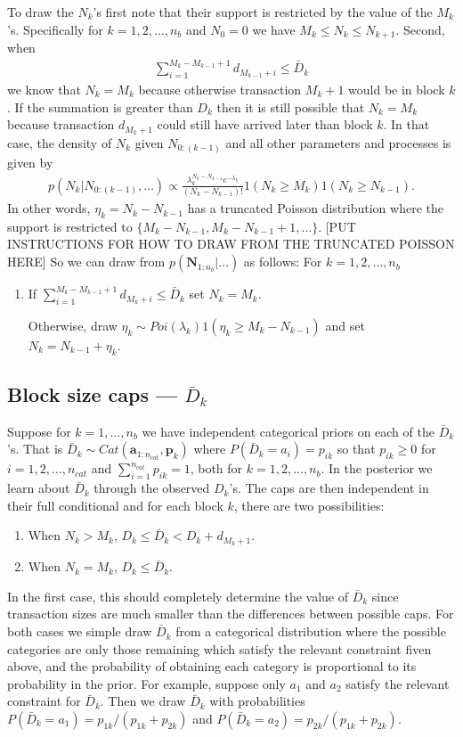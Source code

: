 \documentclass{article}
\begin{document}
To draw the $N_k$'s first note that their support is restricted by the value of the $M_k$'s. Specifically for $k=1,2,\dots,n_b$ and $N_0 = 0$ we have $M_k \le N_k \le N_{k+1}$. Second, when 
\begin{align*}
\sum_{i=1}^{M_k - M_{k-1} + 1}d_{M_{k-1} + i} \le \bar{D}_k
\end{align*}
we know that $N_k = M_k$ because otherwise transaction $M_k + 1$ would be in block $k$. If the summation is greater than $D_k$ then it is still possible that $N_k = M_k$ because transaction $d_{M_k + 1}$ could still have arrived later than block $k$. In that case, the density of $N_k$ given $N_{0:(k-1)}$ and all other parameters and processes is given by
\begin{align*}
p(N_k|N_{0:(k-1)}, \dots) \propto \frac{\lambda_k^{N_k - N_{k-1}}e^{-\lambda_k}}{(N_k - N_{k-1})!}1(N_k \ge M_k)1(N_k \ge N_{k-1}).
\end{align*}
In other words, $\eta_k = N_k - N_{k-1}$ has a truncated Poisson distribution where the support is restricted to $\{M_k - N_{k-1}, M_k - N_{k-1} + 1, \dots \}$. [PUT INSTRUCTIONS FOR HOW TO DRAW FROM THE TRUNCATED POISSON HERE] So we can draw from $p(\bm{N}_{1:n_b}|\dots)$ as follows: For $k=1,2,\dots,n_b$
\begin{enumerate}
\item If $\sum_{i=1}^{M_k - M_{k-1} + 1} d_{M_k + i} \le \bar{D}_k$ set $N_k = M_k$.

Otherwise, draw $\eta_k \sim Poi(\lambda_k)1(\eta_k \ge M_k - N_{k-1})$ and set $N_k = N_{k-1} + \eta_k$.
\end{enumerate}
\subsection{Block size caps --- $\bar{D}_k$}
Suppose for $k=1,\dots,n_b$ we have independent categorical priors on each of the $\bar{D}_k$'s. That is $\bar{D}_k \sim Cat(\bm{a}_{1:n_{cat}}, \bm{p}_{k})$ where $P(\bar{D}_k = a_i) = p_{ik}$ so that $p_{ik}\ge 0$ for $i=1,2,\dots,n_{cat}$ and $\sum_{i=1}^{n_{cat}}p_{ik} = 1$, both for $k=1,2,\dots,n_b$. In the posterior we learn about $\bar{D}_k$ through the observed $D_k$'s. The caps are then independent in their full conditional and for each block $k$, there are two possibilities:
\begin{enumerate}
\item When $N_k > M_k$, $D_k \le \bar{D}_k < D_k + d_{M_k+1}$.
\item When $N_k = M_k$, $D_k \le \bar{D}_k$.
\end{enumerate}
In the first case, this should completely determine the value of $\bar{D}_k$ since transaction sizes are much smaller than the differences between possible caps. For both cases we simple draw $\bar{D}_k$ from a categorical distribution where the possible categories are only those remaining which satisfy the relevant constraint fiven above, and the probability of obtaining each category is proportional to its probability in the prior. For example, suppose only $a_1$ and $a_2$ satisfy the relevant constraint for $\bar{D}_k$. Then we draw $\bar{D}_k$ with probabilities $P(\bar{D}_k = a_1) = p_{1k}/(p_{1k} + p_{2k})$ and $P(\bar{D}_k = a_2) = p_{2k}/(p_{1k} + p_{2k})$.
\end{document}

